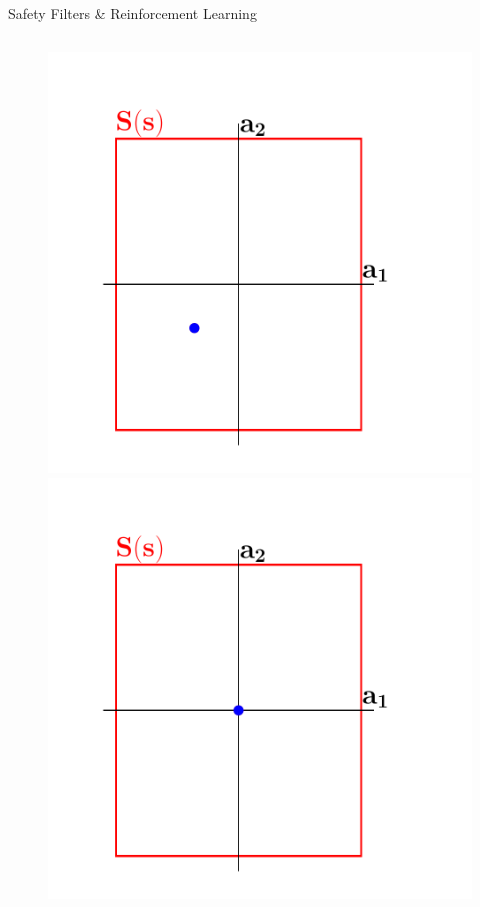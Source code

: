 \documentclass[lecture]{beamer}
\begin{document}
\begin{frame}{\normalsize Safety Filters \& Reinforcement Learning}
\begin{columns}[t]
\begin{overlayarea}{\textwidth}{.5\textheight}
\begin{figure}
{	}
	      \only<6>
        {
        \center
	\includegraphics[width=1\textwidth,clip]{Codes/SafetyFilters/Projection3.pdf}
	}
	      \only<7>
        {
        \center
	\includegraphics[width=1\textwidth,clip]{Codes/SafetyFilters/Projection4.pdf}
}
\end{figure}
\end{overlayarea}
\end{columns}
\end{frame}
\end{document}
